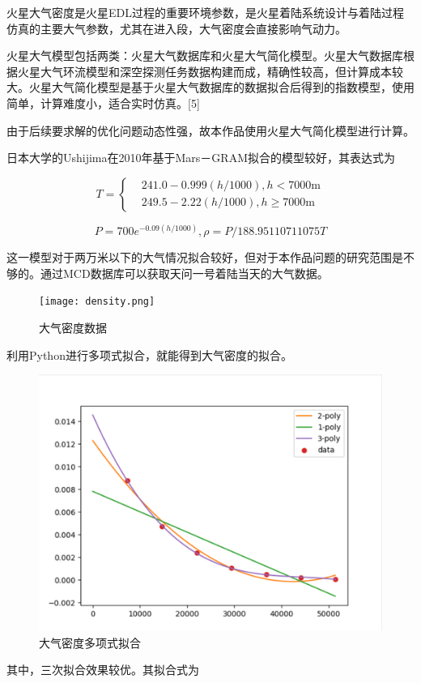 \documentclass[UTF8,12pt]{ctexart}
\begin{document}
	火星大气密度是火星EDL过程的重要环境参数，是火星着陆系统设计与着陆过程仿真的主要大气参数，尤其在进入段，大气密度会直接影响气动力。
	
	火星大气模型包括两类：火星大气数据库和火星大气简化模型。火星大气数据库根据火星大气环流模型和深空探测任务数据构建而成，精确性较高，但计算成本较大。火星大气简化模型是基于火星大气数据库的数据拟合后得到的指数模型，使用简单，计算难度小，适合实时仿真。[5]
	
	由于后续要求解的优化问题动态性强，故本作品使用火星大气简化模型进行计算。
	
	日本大学的Ushijima在2010年基于Mars－GRAM拟合的模型较好，其表达式为		

	\begin{equation}
		T=\left\{\begin{aligned}
			&241.0-0.999(h/1000),h<7000\mathrm{m}\\
			&249.5-2.22(h/1000),h\geq7000\mathrm{m}
		\end{aligned}\right.
		\end{equation}
		
		\begin{equation}
			P=700e^{-0.09(h/1000)},\rho=P/188.95110711075T
		\end{equation}
		
		这一模型对于两万米以下的大气情况拟合较好，但对于本作品问题的研究范围是不够的。通过MCD数据库可以获取天问一号着陆当天的大气数据。
		
\begin{figure}[htb]
			\centering
			\texttt{[image: density.png]}
			\caption{大气密度数据}
			\label{fig}	
\end{figure}
利用Python进行多项式拟合，就能得到大气密度的拟合。
\begin{figure}[htb]
	\centering
	\includegraphics[width=0.6\linewidth]{大气密度拟合.png}
	\caption{大气密度多项式拟合}
	\label{fig}	
\end{figure}

其中，三次拟合效果较优。其拟合式为
\end{document}
